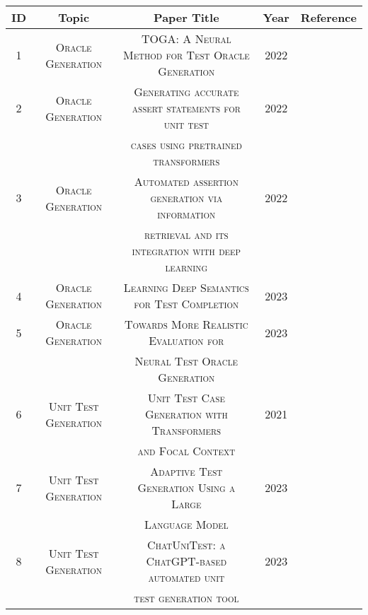 \begin{table}[H]
\centering


    \begin{tabular}{c|c|c|c|c}
        \textbf{ID} & \textbf{Topic} & \textbf{Paper Title} & \textbf{Year} & \textbf{Reference}\\
        \hline 
        1 & \scriptsize\textsc{Oracle Generation} & \scriptsize\textsc{TOGA: A Neural Method for Test Oracle Generation} & 2022 & \cite{gabriel_ryan_toga_2022}\\
        
        2 & \scriptsize\textsc{Oracle Generation} & \scriptsize\textsc{Generating accurate assert statements for unit test} & 2022 & \cite{tufano_generating_2022}\\
        & & \scriptsize\textsc{cases using pretrained transformers} & & \\
        
        3 & \scriptsize\textsc{Oracle Generation} & \scriptsize\textsc{Automated assertion generation via information} & 2022 & \cite{yu_automated_2022}\\
        & & \scriptsize\textsc{retrieval and its integration with deep learning} & & \\
        
        4 & \scriptsize\textsc{Oracle Generation} & \scriptsize\textsc{Learning Deep Semantics for Test Completion} & 2023 & \cite{nie_learning_2023}\\

        5 & \scriptsize\textsc{Oracle Generation} & \scriptsize\textsc{Towards More Realistic Evaluation for} & 2023 & \cite{liu_towards_2023}\\
        & & \scriptsize\textsc{Neural Test Oracle Generation} & & \\
        
        6 & \scriptsize\textsc{Unit Test Generation} & \scriptsize\textsc{Unit Test Case Generation with Transformers} & 2021 & \cite{tufano_unit_2021}\\
        & & \scriptsize\textsc{and Focal Context} & & \\
        
        7 & \scriptsize\textsc{Unit Test Generation} & \scriptsize\textsc{Adaptive Test Generation Using a Large} & 2023 & \cite{schafer_adaptive_2023}\\
        & & \scriptsize\textsc{Language Model} & & \\
        
        8 & \scriptsize\textsc{Unit Test Generation} & \scriptsize\textsc{ChatUniTest: a ChatGPT-based automated unit} & 2023 & \cite{xie_chatunitest_2023}\\
        & & \scriptsize\textsc{test generation tool} & & \\
        

\end{tabular}
\end{table}
